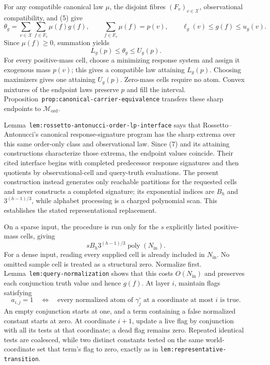 For any compatible canonical law \(\mu\), the disjoint fibres \((F_v)_{v\in\mathcal X}\), observational compatibility, and (5) give
\[
 \theta_g
 =\sum_{v\in\mathcal X}\sum_{f\in F_v}\mu(f)g(f),
 \qquad
 \sum_{f\in F_v}\mu(f)=p(v),
 \qquad
 \ell_g(v)\leq g(f)\leq u_g(v).
\]
Since \(\mu(f)\geq0\), summation yields
\[
 L_g(p)\leq\theta_g\leq U_g(p).
 \tag{7}
\]
For every positive-mass cell, choose a minimizing response system and assign it exogenous mass \(p(v)\); this gives a compatible law attaining \(L_g(p)\). Choosing maximizers gives one attaining \(U_g(p)\). Zero-mass cells require no atom. Convex mixtures of the endpoint laws preserve \(p\) and fill the interval. Proposition~\texttt{prop:canonical-carrier-equivalence} transfers these sharp endpoints to \(\mathcal M_{\mathrm{ord}}\).

Lemma~\texttt{lem:rossetto-antonucci-order-lp-interface} says that Rossetto--Antonucci's canonical response-signature program has the sharp extrema over this same order-only class and observational law. Since (7) and its attaining constructions characterize those extrema, the endpoint values coincide. Their cited interface begins with completed predecessor response signatures and then quotients by observational-cell and query-truth evaluations. The present construction instead generates only reachable partitions for the requested cells and never constructs a completed signature; its exponential indices are \(B_h\) and \(3^{(h-1)/3}\), while alphabet processing is a charged polynomial scan. This establishes the stated representational replacement.

On a sparse input, the procedure is run only for the \(s\) explicitly listed positive-mass cells, giving
\[
 sB_h3^{(h-1)/3}\operatorname{poly}(N_{\mathrm{in}}).
\]
For a dense input, reading every supplied cell is already included in \(N_{\mathrm{in}}\). No omitted sample cell is treated as a structural zero.
Normalize first. Lemma~\texttt{lem:query-normalization} shows that this costs \(O(N_{\mathrm{in}})\) and preserves each conjunction truth value and hence \(g(f)\). At layer \(i\), maintain flags satisfying
\[
 a_{i,j}=1
 \quad\Longleftrightarrow\quad
 \text{every normalized atom of \(\gamma_j^{\circ}\) at a coordinate at most \(i\) is true}.
 \tag{8}
\]
An empty conjunction starts at one, and a term containing a false normalized constant starts at zero. At coordinate \(i+1\), update a live flag by conjunction with all its tests at that coordinate; a dead flag remains zero. Repeated identical tests are coalesced, while two distinct constants tested on the same world-coordinate set that term's flag to zero, exactly as in \texttt{lem:representative-transition}.


